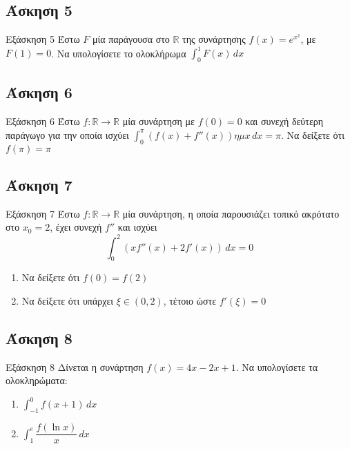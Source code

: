\documentclass[greek]{beamer}
\begin{document}
\subsection{Άσκηση 5}
\begin{frame}[label=Άσκηση5,t]{Εξάσκηση 5}
 Έστω $F$ μία παράγουσα στο $\mathbb{R}$ της συνάρτησης $f(x)=e^{x^2}$, με $F(1)=0$. Να υπολογίσετε το ολοκλήρωμα $\int_{0}^{1} F(x) \,dx$

\end{frame}

\subsection{Άσκηση 6}
\begin{frame}[label=Άσκηση6,t]{Εξάσκηση 6}
Έστω $f:\mathbb{R}\to\mathbb{R}$ μία συνάρτηση με $f(0)=0$ και συνεχή δεύτερη παράγωγο για την οποία ισχύει $\int_{0}^{π} \left( f(x)+f''(x) \right)ημx  \,dx=π$. Να δείξετε ότι $f(π)=π$

\end{frame}

\subsection{Άσκηση 7}
\begin{frame}[label=Άσκηση7,t]{Εξάσκηση 7}
 Έστω $f:\mathbb{R}\to\mathbb{R}$ μία συνάρτηση, η οποία παρουσιάζει τοπικό ακρότατο στο $x_0=2$, έχει συνεχή $f''$ και ισχύει
 $$\int_{0}^{2} \left( xf''(x)+2f'(x) \right) \,dx=0$$
 \begin{enumerate}
  \item<1-> Να δείξετε ότι $f(0)=f(2)$
  \item<2-> Να δείξετε ότι υπάρχει $ξ\in (0,2)$, τέτοιο ώστε $f'(ξ)=0$
 \end{enumerate}

\end{frame}

\subsection{Άσκηση 8}
\begin{frame}[label=Άσκηση8,t]{Εξάσκηση 8}
 Δίνεται η συνάρτηση $f(x)=4x-2x+1$. Να υπολογίσετε τα ολοκληρώματα:
 \begin{enumerate}
  \item<1-> $\int_{-1}^{0} f(x+1) \,dx$
  \item<2-> $\int_{1}^{e} \dfrac{f(\ln x)}{x} \,dx$
 \end{enumerate}

\end{frame}
\end{document}
